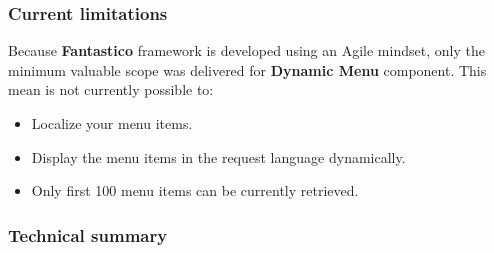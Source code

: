 \documentclass[letterpaper,10pt,english]{sphinxmanual}
\begin{document}
\subsubsection{Current limitations}
\label{features/components/dynamic_menu/dynamic_menu:current-limitations}
Because \textbf{Fantastico} framework is developed using an Agile mindset, only the minimum valuable scope was delivered for
\textbf{Dynamic Menu} component. This mean is not currently possible to:
\begin{itemize}
\item {} 
Localize your menu items.

\item {} 
Display the menu items in the request language dynamically.

\item {} 
Only first 100 menu items can be currently retrieved.

\end{itemize}


\subsubsection{Technical summary}
\label{features/components/dynamic_menu/dynamic_menu:technical-summary}
\end{document}
